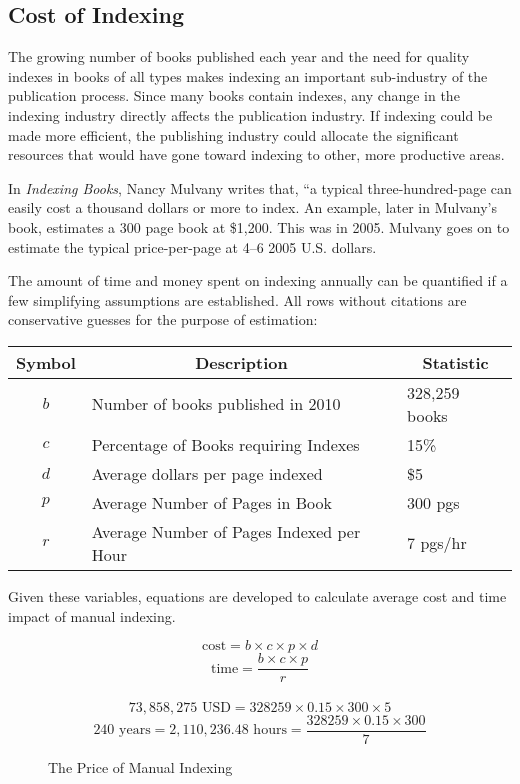 \subsection{Cost of Indexing}

The growing number of books published each year and the need for quality indexes in books of all types makes indexing an important sub-industry of the publication process.
Since many books contain indexes, any change in the indexing industry directly affects the publication industry.
If indexing could be made more efficient, the publishing industry could allocate the significant resources that would have gone toward indexing to other, more productive areas.

In {\it Indexing Books}, Nancy Mulvany writes that, ``a typical three-hundred-page can easily cost a thousand dollars or more to index.
An example, later in Mulvany's book, estimates a 300 page book at \$1,200.
This was in 2005.
Mulvany goes on to estimate the typical price-per-page at 4--6 2005 U.S. dollars\cite{mulvany}.

The amount of time and money spent on indexing annually can be quantified if a few simplifying assumptions are established.
All rows without citations are conservative guesses for the purpose of estimation:

\begin{center}
\begin{tabular}{|c|l|l|}
\hline
\multicolumn{1}{|c|}{{\bf Symbol}} & \multicolumn{1}{c|}{{\bf Description}} & \multicolumn{1}{c|}{{\bf Statistic}} \\
\hline
$b$ & Number of books published in 2010 \cite{bowker} & 328,259 books \\
\hline
$c$ & Percentage of Books requiring Indexes & 15\% \\
\hline
$d$ & Average dollars per page indexed \cite{mulvany} & \$5 \\
\hline 
$p$ & Average Number of Pages in Book & 300 pgs \\ 
\hline 
$r$ & Average Number of Pages Indexed per Hour \cite{connolly} & 7 pgs/hr \\
\hline
\end{tabular}
\end{center}

Given these variables, equations are developed to calculate average cost and time impact of manual indexing.

\begin{figure}[H]
$$ \text{cost} = b \times c \times p \times d $$
$$ \text{time} = \frac{b \times c \times p}{r} $$
\\
$$ 73,858,275 \text{ USD} = 328259 \times 0.15 \times 300 \times 5 $$
$$ 240 \text{ years}= 2,110,236.48 \text{ hours} = \frac{328259 \times 0.15 \times 300}{7}$$
\caption{The Price of Manual Indexing}
\end{figure}

